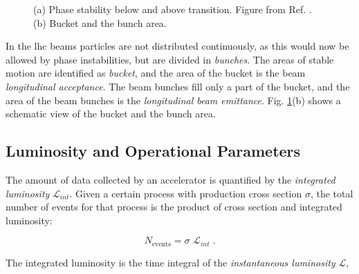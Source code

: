 \begin{figure}[ht]
\centering
{}
\caption{(a) Phase stability below and above transition. Figure from Ref. \cite{Tecker:2016mlq}. (b) Bucket and the bunch area.}
\label{fig:lhc:phase}
\end{figure}


In the \gls{lhc} beams particles are not distributed continuously, as this would now be allowed by phase instabilities, but are divided in \textit{bunches}. 
The areas of stable motion are identified as \textit{bucket}, and the area of the bucket is the beam \textit{longitudinal acceptance}. The beam bunches fill only a part of the bucket, and the area of the beam bunches is the \textit{longitudinal beam emittance}. Fig. \ref{fig:lhc:phase}(b) shows a schematic view of the bucket and the bunch area.

\subsection{Luminosity and Operational Parameters}

The amount of data collected by an accelerator is quantified by the \textit{integrated luminosity} $\mathcal{L}_{int}$.
Given a certain process with production cross section $\sigma$, the total number of events for that process is the product of cross section and integrated luminosity:

\begin{equation}
\label{eq:cern:nev}
N_{\mathrm{events}} = \sigma \,\, \mathcal{L}_{int} \; .
\end{equation}

The integrated luminosity is the time integral of the \textit{instantaneous luminosity} $\mathcal{L}$, 

